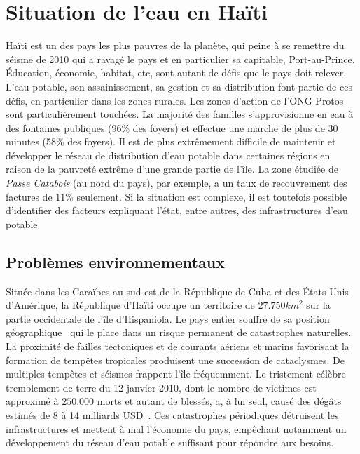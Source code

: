 \documentclass{EPL-master-thesis-covers-FR}
\begin{document}
		\section{Situation de l'eau en Haïti}
			\label{sec:situation}


			Haïti est un des pays les plus pauvres de la planète, qui peine à se remettre du séisme de 2010 qui a ravagé le pays et en particulier sa capitable, Port-au-Prince. \'Education, économie, habitat, etc, sont autant de défis que le pays doit relever. L'eau potable, son assainissement, sa gestion et sa distribution font partie de ces défis, en particulier dans les zones rurales. Les zones d'action de l'ONG Protos sont particulièrement touchées. La majorité des familles s'approvisionne en eau à des fontaines publiques (96\% des foyers) et effectue une marche de plus de 30 minutes (58\% des foyers). Il est de plus extrêmement difficile de maintenir et développer le réseau de distribution d'eau potable dans certaines régions en raison de la pauvreté extrême d'une grande partie de l'île. La zone étudiée de \emph{Passe Catabois} (au nord du pays), par exemple, a un taux de recouvrement des factures de 11\% seulement. Si la situation est complexe, il est toutefois possible d'identifier des facteurs expliquant l'état, entre autres, des infrastructures d'eau potable.


			\subsection*{Problèmes environnementaux}

				Située dans les Caraïbes au sud-est de la République de Cuba et des \'Etats-Unis d'Amérique, la République d'Haïti occupe un territoire de $27.750km^{2}$ sur la partie occidentale de l'île d'Hispaniola. Le pays entier souffre de sa position géographique~\cite{ref:regards_situation_eau_haiti} qui le place dans un risque permanent de catastrophes naturelles. La proximité de failles tectoniques et de courants aériens et marins favorisant la formation de tempêtes tropicales produisent une succession de cataclysmes. De multiples tempêtes et séismes frappent l'île fréquemment. Le tristement célèbre tremblement de terre du 12 janvier 2010, dont le nombre de victimes est approximé à $250.000$ morts et autant de blessés, a, à lui seul, causé des dégâts estimés de 8 à 14 milliards USD~\cite{ref:estimating_economic_damage_earthquake_haiti}. Ces catastrophes périodiques détruisent les infrastructures et mettent à mal l'économie du pays, empêchant notamment un développement du réseau d'eau potable suffisant pour répondre aux besoins.
\end{document}

